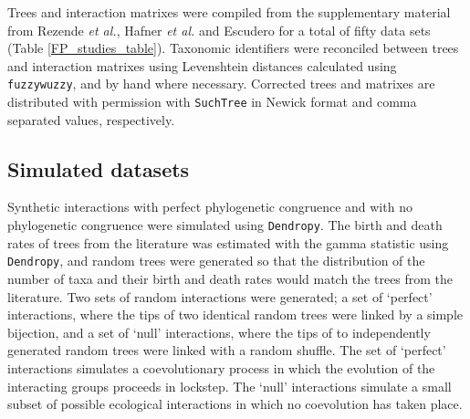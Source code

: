 Trees and interaction matrixes were compiled from the supplementary material from Rezende {\em et al.}, \cite{rezende2007non} Hafner {\em et al.} \cite{hafner1994disparate} and Escudero \cite{escudero2015phylogenetic} for a total of fifty data sets (Table \ref{FP_studies_table}). Taxonomic identifiers were reconciled between trees and interaction matrixes using Levenshtein distances \cite{levenshtein1966binary} calculated using {\tt fuzzywuzzy}, \cite{fuzzywuzzy} and by hand where necessary. Corrected trees and matrixes are distributed with permission with {\tt SuchTree} in Newick format and comma separated values, respectively.

\subsection{Simulated datasets}

Synthetic interactions with perfect phylogenetic congruence and with no phylogenetic congruence were simulated using {\tt Dendropy}. \cite{sukumaran2010dendropy} The birth and death rates of trees from the literature was estimated with the gamma statistic \cite{pybus2000testing} using {\tt Dendropy}, and random trees were generated so that the distribution of the number of taxa and their birth and death rates would match the trees from the literature. Two sets of random interactions were generated; a set of `perfect' interactions, where the tips of two identical random trees were linked by a simple bijection, and a set of `null' interactions, where the tips of to independently generated random trees were linked with a random shuffle. The set of `perfect' interactions simulates a coevolutionary process in which the evolution of the interacting groups proceeds in lockstep. The `null' interactions simulate a small subset of possible ecological interactions in which no coevolution has taken place.